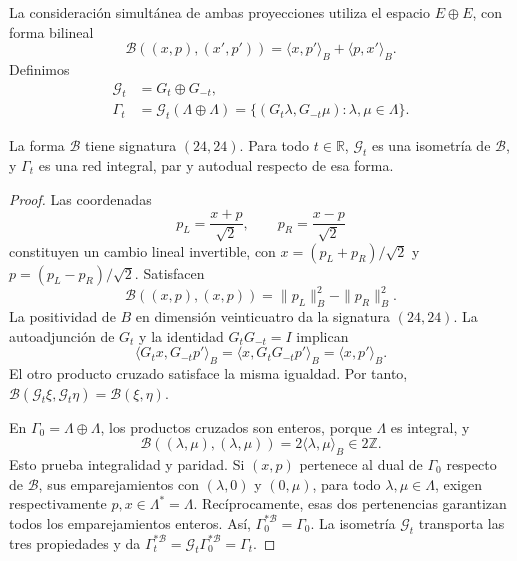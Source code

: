 La consideración simultánea de ambas proyecciones utiliza el espacio
\(E\oplus E\), con forma bilineal
\begin{equation}
 \mathcal B((x,p),(x',p'))
 =\langle x,p'\rangle_B+\langle p,x'\rangle_B.
 \label{corpus9:xii:forma-bilineal-partida}
\end{equation}
Definimos
\begin{equation}
 \begin{aligned}
 \mathcal G_t&=G_t\oplus G_{-t},\\
 \Gamma_t&=\mathcal G_t(\Lambda\oplus\Lambda)
 =\{(G_t\lambda,G_{-t}\mu):\lambda,\mu\in\Lambda\}.
 \end{aligned}
 \label{corpus9:xii:red-partida}
\end{equation}

\begin{theorem}
\label{corpus9:xii:teorema-partido}
La forma \(\mathcal B\) tiene signatura \((24,24)\).
Para todo \(t\in\mathbb R\), \(\mathcal G_t\) es una isometría
de \(\mathcal B\), y \(\Gamma_t\) es una red integral, par y
autodual respecto de esa forma.
\end{theorem}
\begin{proof}
Las coordenadas
\[
 p_L=\frac{x+p}{\sqrt2},\qquad p_R=\frac{x-p}{\sqrt2}
\]
constituyen un cambio lineal invertible, con
\(x=(p_L+p_R)/\sqrt2\) y \(p=(p_L-p_R)/\sqrt2\). Satisfacen
\[
 \mathcal B((x,p),(x,p))=\|p_L\|_B^2-\|p_R\|_B^2.
\]
La positividad de \(B\) en dimensión veinticuatro da la signatura
\((24,24)\). La autoadjunción de \(G_t\) y la identidad
\(G_tG_{-t}=I\) implican
\[
 \langle G_tx,G_{-t}p'\rangle_B
 =\langle x,G_tG_{-t}p'\rangle_B=\langle x,p'\rangle_B.
\]
El otro producto cruzado satisface la misma igualdad. Por tanto,
\(\mathcal B(\mathcal G_t\xi,\mathcal G_t\eta)
=\mathcal B(\xi,\eta)\).

En \(\Gamma_0=\Lambda\oplus\Lambda\), los productos cruzados son
enteros, porque \(\Lambda\) es integral, y
\[
 \mathcal B((\lambda,\mu),(\lambda,\mu))
 =2\langle\lambda,\mu\rangle_B\in2\mathbb Z.
\]
Esto prueba integralidad y paridad. Si \((x,p)\) pertenece al dual
de \(\Gamma_0\) respecto de \(\mathcal B\), sus emparejamientos
con \((\lambda,0)\) y \((0,\mu)\), para todo
\(\lambda,\mu\in\Lambda\), exigen respectivamente
\(p,x\in\Lambda^*=\Lambda\). Recíprocamente, esas dos pertenencias
garantizan todos los emparejamientos enteros. Así,
\(\Gamma_0^{*\mathcal B}=\Gamma_0\). La isometría
\(\mathcal G_t\) transporta las tres propiedades y da
\(\Gamma_t^{*\mathcal B}=\mathcal G_t\Gamma_0^{*\mathcal B}
=\Gamma_t\).
\end{proof}

